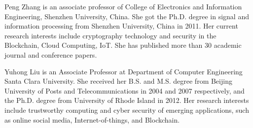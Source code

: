 \documentclass[journal]{IEEEtran}
\begin{document}
\begin{IEEEbiography}{Peng Zhang}
is an associate professor of College of Electronics and Information Engineering, Shenzhen University, China. She got the Ph.D. degree in signal and information processing from Shenzhen University, China in 2011. Her current research interests include cryptography technology and security in the Blockchain, Cloud Computing, IoT. She has published more than 30 academic journal and conference papers.
\end{IEEEbiography}

\begin{IEEEbiography}{Yuhong Liu}
is an Associate Professor at Department of Computer Engineering Santa Clara University. She received her B.S. and M.S. degree from Beijing University of Posts and Telecommunications in 2004 and 2007 respectively, and the Ph.D. degree from University of Rhode Island in 2012. Her research interests include trustworthy computing and cyber security of emerging applications, such as online social media, Internet-of-things, and Blockchain.
\end{IEEEbiography}
\end{document}
